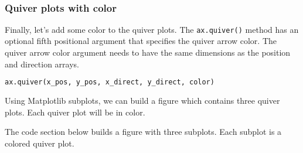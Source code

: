 \documentclass{book}
\newcommand{\passthrough}[1]{#1}
\begin{document}
    \begin{center}
    \end{center}
    { \hspace*{\fill} \\}
    

    
        \hypertarget{quiver-plots-with-color}{%
\subsubsection{Quiver plots with color}\label{quiver-plots-with-color}}

Finally, let's add some color to the quiver plots. The
\passthrough{\lstinline!ax.quiver()!} method has an optional fifth
positional argument that specifies the quiver arrow color. The quiver
arrow color argument needs to have the same dimensions as the position
and direction arrays.

\begin{lstlisting}[language=Python]
ax.quiver(x_pos, y_pos, x_direct, y_direct, color)
\end{lstlisting}

Using Matplotlib subplots, we can build a figure which contains three
quiver plots. Each quiver plot will be in color.

The code section below builds a figure with three subplots. Each subplot
is a colored quiver plot.
    
\end{document}
